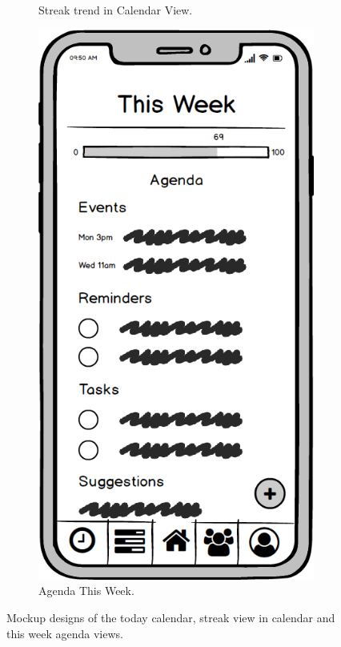 \begin{figure}
\begin{subfigure}[b]{0.3\textwidth}
        \caption{Streak trend in Calendar View.}
        \label{fig:dashboard_streak_calendar}
    \end{subfigure}
    \hfill
    \begin{subfigure}[b]{0.3\textwidth}
        \centering
        \includegraphics[width=\textwidth]{./graphics/design/Dashboard (This Week Agenda View).png}
        \caption{Agenda This Week.}
        \label{fig:this_week_agenda}
    \end{subfigure}
    
    \caption{Mockup designs of the today calendar, streak view in calendar and this week agenda views.}
    \label{fig:todaycal_streakcal_thisweekagenda}
\end{figure}

